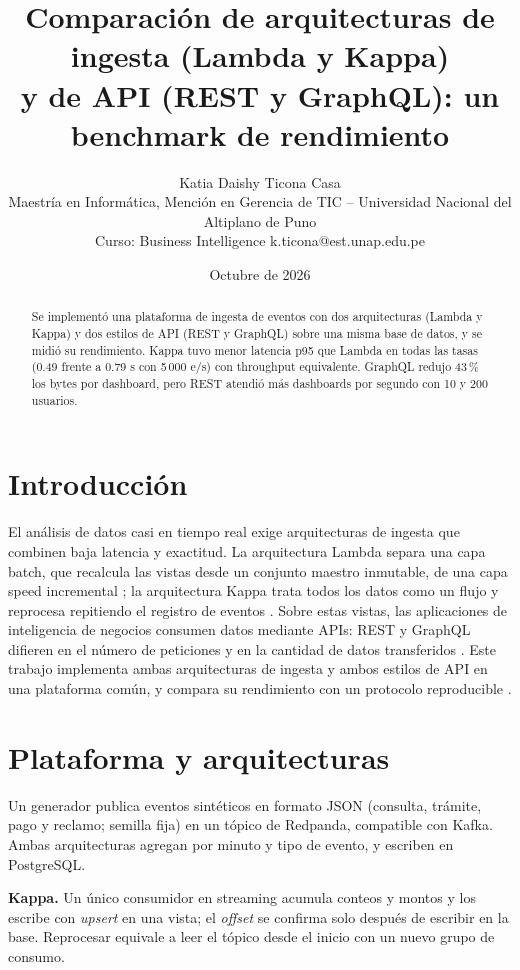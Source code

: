 \documentclass[10pt,a4paper,twocolumn]{article}
\title{\bfseries Comparación de arquitecturas de ingesta (Lambda y Kappa)\\
y de API (REST y GraphQL): un benchmark de rendimiento}
\author{Katia Daishy Ticona Casa\\
\small Maestría en Informática, Mención en Gerencia de TIC -- Universidad Nacional del Altiplano de Puno\\
\small Curso: Business Intelligence \quad k.ticona@est.unap.edu.pe}
\date{Octubre de 2026}
\begin{document}
\maketitle

\begin{abstract}\small
Se implementó una plataforma de ingesta de eventos con dos arquitecturas (Lambda y Kappa) y dos estilos de API
(REST y GraphQL) sobre una misma base de datos, y se midió su rendimiento. Kappa tuvo menor latencia p95 que
Lambda en todas las tasas (0.49 frente a 0.79 s con 5\,000 e/s) con throughput equivalente. GraphQL redujo 43\,\%
los bytes por dashboard, pero REST atendió más dashboards por segundo con 10 y 200 usuarios.
\end{abstract}

\section{Introducción}
El análisis de datos casi en tiempo real exige arquitecturas de ingesta que combinen baja latencia y exactitud.
La arquitectura Lambda separa una capa batch, que recalcula las vistas desde un conjunto maestro inmutable,
de una capa speed incremental \cite{demirezen2023}; la arquitectura Kappa trata todos los datos como un flujo y
reprocesa repitiendo el registro de eventos \cite{feick2018,sanla2019}. Sobre estas vistas, las aplicaciones de inteligencia
de negocios consumen datos mediante APIs: REST y GraphQL difieren en el número de peticiones y en la cantidad
de datos transferidos \cite{mikula2020,elghazal2025,seabra2019}. Este trabajo implementa ambas arquitecturas de ingesta y ambos
estilos de API en una plataforma común, y compara su rendimiento con un protocolo reproducible
\cite{karimov2018}.

\section{Plataforma y arquitecturas}
Un generador publica eventos sintéticos en formato JSON (consulta, trámite, pago y reclamo; semilla fija) en
un tópico de Redpanda, compatible con Kafka. Ambas arquitecturas agregan por minuto y tipo de evento, y
escriben en PostgreSQL.

\textbf{Kappa.} Un único consumidor en streaming acumula conteos y montos y los escribe con \emph{upsert} en
una vista; el \emph{offset} se confirma solo después de escribir en la base. Reprocesar equivale a leer el
tópico desde el inicio con un nuevo grupo de consumo.
\end{document}
